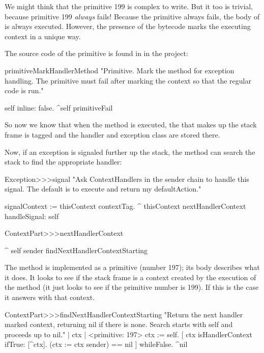 \documentclass[a4paper,10pt,twoside]{book}
\begin{document}
We might think that the primitive 199 is complex to write. 
But it too is trivial, because primitive 199 \emph{always} fails!
Because the primitive always fails, the \st{} body of  is always executed.
However, the presence of the  bytecode marks the executing context in a unique way. 

The source code of the primitive is found in  in the  \sqsrc project: 

\begin{code}{}
primitiveMarkHandlerMethod
     "Primitive. Mark the method for exception handling. The primitive must fail after
     marking the context so that the regular code is run."
     
     self inline: false.
    ^self primitiveFail
\end{code}
So now we know that when the method  is executed, the  that makes up the stack frame is tagged and the handler and exception class 
are stored there. 

Now, if an exception is signaled further up the stack, the method  can search the stack to find the appropriate handler:

\begin{code}{}
Exception>>>signal
	"Ask ContextHandlers in the sender chain to handle this signal.
	The default is to execute and return my defaultAction."

	signalContext := thisContext contextTag.
	^ thisContext nextHandlerContext handleSignal: self
\end{code}

\begin{code}{}
ContextPart>>>nextHandlerContext

	^ self sender findNextHandlerContextStarting
\end{code}

The method  is implemented as a primitive (number 197); its body describes what it does. It looks to see
if the stack frame is a context created by the execution of the method  (it just looks to see if the primitive number is 199). If this is the case it answers with that context. 

\begin{code}{}
ContextPart>>>findNextHandlerContextStarting 
	"Return the next handler marked context, returning nil if there 
	is none. Search starts with self and proceeds up to nil." 
	| ctx |	
	<primitive: 197> 
	ctx := self. 
	[  ctx isHandlerContext ifTrue: [^ctx]. 
	   (ctx := ctx sender) == nil ] whileFalse. 
	^nil 
\end{code}
\end{document}
